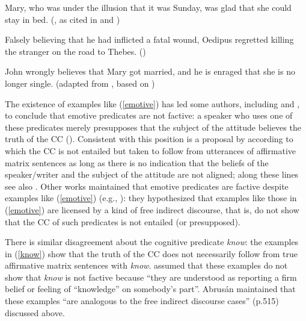 \documentclass[11pt,fleqn]{article}
\newcommand{\6}{\mbox{$[\hspace*{-.6mm}[$}}
\newcommand{\9}{\mbox{$]\hspace*{-.6mm}]$}}
\begin{document}
\begin{exe}
\ex\label{emotive}
\begin{xlist}

\ex\label{heim2} Mary, who was under the illusion that it was Sunday, was glad that she could stay in bed. (\citealt{klein1975}, as cited in \citealt[122]{gazdar79a} and \citealt[fn37]{heim92}) 

\ex Falsely believing that he had inflicted a fatal wound, Oedipus regretted killing the stranger on the road to Thebes. \hfill (\citealt{klein1975})

\ex John wrongly believes that Mary got married, and he is enraged that she is no longer single. \hspace*{.2cm} \hfill (adapted from \citealt{egre2008}, based on \citealt{schlenker03})

\end{xlist}
\end{exe}
The existence of examples like (\ref{emotive}) has led some authors, including \citet{klein1975,giannakidou1998,schlenker2003} and \citet{egre2008}, to conclude that emotive predicates are not factive: a speaker who uses one of these predicates merely presupposes that the subject of the attitude believes the truth of the CC (\citealt{heim92}). Consistent with this position is a proposal by \citet{karttunen2016} according to which the CC is not entailed but taken to follow from utterances of affirmative matrix sentences as long as there is no indication that the beliefs of the speaker/writer and the subject of the attitude are not aligned; along these lines see also \citealt{djaerv-thesis}. %
Other works maintained that emotive predicates are factive despite examples like (\ref{emotive}) (e.g., \citealt{gazdar79a,abrusan2011,anand-hacquard2014}): they hypothesized that examples like those in (\ref{emotive}) are licensed by a kind of free indirect discourse, that is, do not show that the CC of such predicates is not entailed (or presupposed). 

There is similar disagreement about the cognitive predicate {\em know}: the examples in (\ref{know}) show that the truth of the CC does not necessarily follow from true affirmative matrix sentences with {\em know}. \citet{abrusan2011} assumed that these examples do not show that {\em know} is not factive because ``they are understood as reporting a firm belief or feeling of ``knowledge'' on somebody's part''. Abrus\'an maintained that these examples ``are analogous to the free indirect discourse cases'' (p.515) discussed above.
\end{document}
